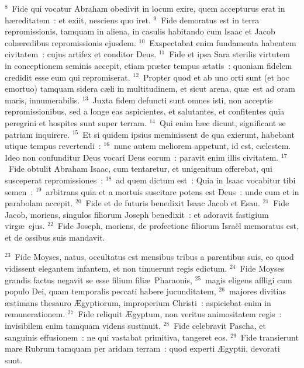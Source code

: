 ${}^{8}$~Fide qui vocatur Abraham obedivit in locum exire, quem accepturus erat in h\ae reditatem~: et exiit, nesciens quo iret.
${}^{9}$~Fide demoratus est in terra repromissionis, tamquam in aliena, in casulis habitando cum Isaac et Jacob coh\ae redibus repromissionis ejusdem.
${}^{10}$~Exspectabat enim fundamenta habentem civitatem~: cujus artifex et conditor Deus.
${}^{11}$~Fide et ipsa Sara sterilis virtutem in conceptionem seminis accepit, etiam pr\ae ter tempus \ae tatis~: quoniam fidelem credidit esse eum qui repromiserat.
${}^{12}$~Propter quod et ab uno orti sunt (et hoc emortuo) tamquam sidera c\ae li in multitudinem, et sicut arena, qu\ae\ est ad oram maris, innumerabilis.
${}^{13}$~Juxta fidem defuncti sunt omnes isti, non acceptis repromissionibus, sed a longe eas aspicientes, et salutantes, et confitentes quia peregrini et hospites sunt super terram.
${}^{14}$~Qui enim h\ae c dicunt, significant se patriam inquirere.
${}^{15}$~Et si quidem ipsius meminissent de qua exierunt, habebant utique tempus revertendi~:
${}^{16}$~nunc autem meliorem appetunt, id est, c\ae lestem. Ideo non confunditur Deus vocari Deus eorum~: paravit enim illis civitatem.
${}^{17}$~Fide obtulit Abraham Isaac, cum tentaretur, et unigenitum offerebat, qui susceperat repromissiones~:
${}^{18}$~ad quem dictum est~: Quia in Isaac vocabitur tibi semen~:
${}^{19}$~arbitrans quia et a mortuis suscitare potens est Deus~: unde eum et in parabolam accepit.
${}^{20}$~Fide et de futuris benedixit Isaac Jacob et Esau.
${}^{21}$~Fide Jacob, moriens, singulos filiorum Joseph benedixit~: et adoravit fastigium virg\ae\ ejus.
${}^{22}$~Fide Joseph, moriens, de profectione filiorum Isra\"el memoratus est, et de ossibus suis mandavit.


${}^{23}$~Fide Moyses, natus, occultatus est mensibus tribus a parentibus suis, eo quod vidissent elegantem infantem, et non timuerunt regis edictum.
${}^{24}$~Fide Moyses grandis factus negavit se esse filium fili\ae\ Pharaonis,
${}^{25}$~magis eligens affligi cum populo Dei, quam temporalis peccati habere jucunditatem,
${}^{26}$~majores divitias \ae stimans thesauro \AE gyptiorum, improperium Christi~: aspiciebat enim in remunerationem.
${}^{27}$~Fide reliquit \AE gyptum, non veritus animositatem regis~: invisibilem enim tamquam videns sustinuit.
${}^{28}$~Fide celebravit Pascha, et sanguinis effusionem~: ne qui vastabat primitiva, tangeret eos.
${}^{29}$~Fide transierunt mare Rubrum tamquam per aridam terram~: quod experti \AE gyptii, devorati sunt.


